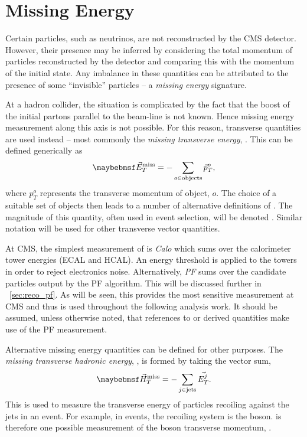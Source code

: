 \section{Missing Energy}
\label{sec:reco_missing_energy}
Certain particles, such as neutrinos, are not reconstructed by the \ac{CMS}
detector. However, their presence may be inferred by considering the total
momentum of particles reconstructed by the detector and comparing this with the
momentum of the initial state. Any imbalance in these quantities can be
attributed to the presence of some ``invisible'' particles -- a \emph{missing
  energy} signature.

At a hadron collider, the situation is complicated by the fact that the boost of
the initial partons parallel to the beam-line is not known. Hence missing energy
measurement along this axis is not possible. For this reason, transverse
quantities are used instead -- most commonly the \emph{missing transverse
  energy}, \METv. This can be defined generically as
\begin{equation*}
\METv = -\sum_{o \in \textrm{objects}} \vec{p}_T^o,
\end{equation*}
where $p_T^o$ represents the transverse momentum of object, $o$. The choice of a
suitable set of objects then leads to a number of alternative definitions of
\METv. The magnitude of this quantity, often used in event selection, will be
denoted \MET. Similar notation will be used for other transverse vector
quantities.

At \ac{CMS}, the simplest measurement of \METv is \emph{\ac{Calo} \METv} which
sums over the calorimeter tower energies (\ac{ECAL} and \ac{HCAL}).  An energy
threshold is applied to the towers in order to reject electronics
noise. Alternatively, \emph{\ac{PF} \METv} sums over the candidate particles output by
the \ac{PF} algorithm. This will be discussed further in
\sec~\ref{sec:reco_pf}. As will be seen, this provides the most sensitive \METv
measurement at \ac{CMS} and thus is used throughout the following analysis
work. It should be assumed, unless otherwise noted, that references to \METv or
derived quantities make use of the \ac{PF} measurement.

Alternative missing energy quantities can be defined for other purposes. The
\emph{missing transverse hadronic energy}, \MHT, is formed by taking the vector
sum,
\begin{equation*}
\MHTv = -\sum_{j \in \textrm{jets}} \vec{E_T^j}.
\end{equation*}
This is used to measure the transverse energy of particles recoiling against the
jets in an event. For example, in \Wjets events, the recoiling system is the \PW
boson. \MHTv is therefore one possible measurement of the \PW boson transverse
momentum, \PtWv.



